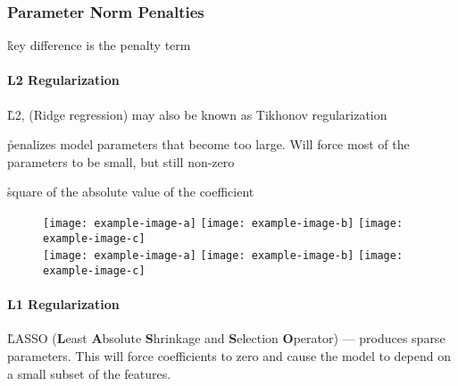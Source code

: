\subsubsection{Parameter Norm Penalties}

\r{key difference is the penalty term}


\paragraph{L2 Regularization}


\r{L2, ({Ridge regression}) may also be known as {Tikhonov regularization}}

\r{penalizes model parameters that become too large. Will force most of the parameters to be small, but still non-zero}

\r{square of the absolute value of the coefficient}

\begin{figure}[htp]
	\centering
	\texttt{[image: example-image-a]}\hfil
	\texttt{[image: example-image-b]}\hfil
	\texttt{[image: example-image-c]}\hfil\\
	\medskip
	\texttt{[image: example-image-a]}\hfil
	\texttt{[image: example-image-b]}\hfil
	\texttt{[image: example-image-c]}\hfil
	\caption{}
	\label{fig:basics_regularization_l2_example}
\end{figure}



\paragraph{L1 Regularization}


\r{LASSO (\textbf{L}east \textbf{A}bsolute \textbf{S}hrinkage and \textbf{S}election \textbf{O}perator) --- produces sparse parameters. This will force coefficients to zero and cause the model to depend on a small subset of the features.}

